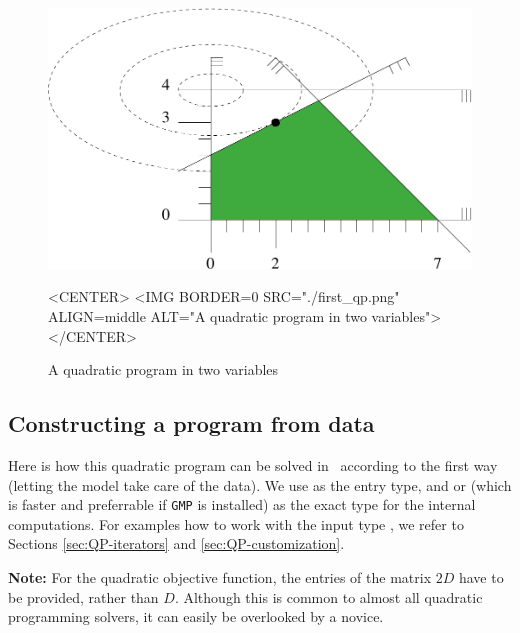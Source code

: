 \begin{figure}[htbp]
\begin{ccTexOnly}
\begin{center}
\includegraphics{QP_solver/first_qp} %
\end{center}
\end{ccTexOnly}

\begin{ccHtmlOnly}
<CENTER>
<IMG BORDER=0 SRC="./first_qp.png" ALIGN=middle ALT="A quadratic program in two variables">
</CENTER>
\end{ccHtmlOnly}

\caption{A quadratic program in two variables
\label{fig:QP-first_qp}}
\end{figure}

\subsection{Constructing a program from data}
Here is how this quadratic program can be solved in \cgal\ 
according to the first way (letting the model take care of
the data). We use  as the entry type, and 
 or  (which is faster and preferrable if
\texttt{GMP} is installed) as the exact type for the
internal computations. For examples 
how to work with the input type , we refer to 
Sections \ref{sec:QP-iterators} and \ref{sec:QP-customization}.

{\bf Note:} For the quadratic objective function, the entries 
of the matrix $2D$ have to be provided, rather than $D$. Although 
this is common to almost all quadratic programming solvers, it 
can easily be overlooked by a novice.


